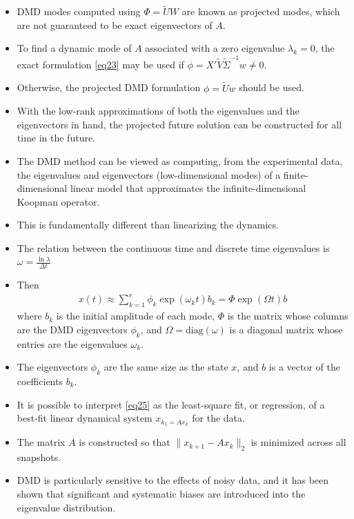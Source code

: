 \documentclass[hyperref={pdfpagemode=FullScreen},aspectratio=169]{beamer}
\begin{document}
\begin{frame}{}
\begin{itemize}
\setlength\itemsep{1em}
\item DMD modes computed using $\Phi = \tilde{U}W$ are known as projected modes, which are not guaranteed to be exact eigenvectors of $A$.
\item To find a dynamic mode of $A$ associated with a zero eigenvalue $\lambda_k=0$, the exact formulation \cref{eq23} may be used if $\phi = X'\tilde{V}\tilde{\Sigma}^{-1}w \neq 0$.
\item Otherwise, the projected DMD formulation $\phi = \tilde{U}w$ should be used. 
\item With the low-rank approximations of both the eigenvalues and the eigenvectors in hand, the projected future solution can be constructed for all time in the future.
\item The DMD method can be viewed as computing, from the experimental data, the eigenvalues and eigenvectors (low-dimensional modes) of a finite-dimensional linear model that approximates the infinite-dimensional Koopman operator.
\item This is fundamentally different than linearizing the dynamics.
\item The relation between the continuous time and discrete time eigenvalues is $\displaystyle \omega = \frac{\ln{\lambda}}{\Delta t}$
\end{itemize}
\end{frame}
\begin{frame}{}
\begin{itemize}
\setlength\itemsep{1em}
\item Then
\begin{align} \label{eq25}
x(t) \approx \sum_{k=1}^{r}\phi_k \exp({\omega_k t})b_k=\Phi \exp({\Omega t})b
\end{align}
where $b_k$ is the initial amplitude of each mode, $\Phi$ is the matrix whose columns are the DMD eigenvectors $\phi_k$, and $\Omega=\text{diag}(\omega)$ is a diagonal matrix whose entries are the eigenvalues $\omega_k$.
\item The eigenvectors $\phi_k$ are the same size as the state $x$, and $b$ is a vector of the coefficients $b_k$.
\item It is possible to interpret \cref{eq25} as the least-square fit, or regression, of a best-fit linear dynamical system $x_{k_1 = Ax_k}$ for the data.
\item The matrix $A$ is constructed so that $\lVert x_{k+1}-Ax_k \rVert_2$ is minimized across all snapshots.
\item  DMD is particularly sensitive to the effects of noisy data, and it has been shown that significant and systematic biases are introduced into the eigenvalue distribution.
\end{itemize}
\end{frame}
\end{document}
